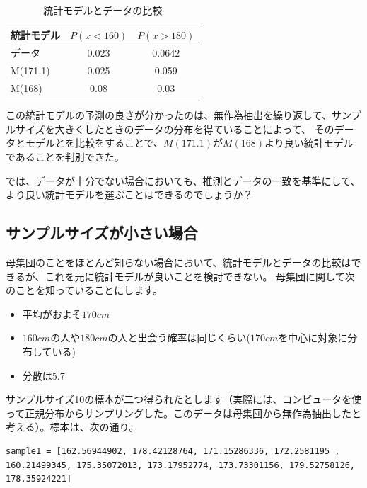 \begin{table}[hbtp]
    \caption{統計モデルとデータの比較}
    \label{table:data_type}
    \centering
    \begin{tabular}{lcc}
    統計モデル  & $P(x<160)$  & $P(x>180)$   \\
    \hline \hline
    データ &  0.023 &  0.0642\\
    M(171.1) & 0.025 & 0.059  \\
    M(168) &  0.08 & 0.03 \\
      \hline
    \end{tabular}
  \end{table}


この統計モデルの予測の良さが分かったのは、無作為抽出を繰り返して、サンプルサイズを大きくしたときのデータの分布を得ていることによって、
そのデータとモデルとを比較をすることで、$M(171.1)$が$M(168)$より良い統計モデルであることを判別できた。

では、データが十分でない場合においても、推測とデータの一致を基準にして、より良い統計モデルを選ぶことはできるのでしょうか？

\subsection{サンプルサイズが小さい場合}
母集団のことをほとんど知らない場合において、統計モデルとデータの比較はできるが、これを元に統計モデルが良いことを検討できない。
母集団に関して次のことを知っていることにします。
\begin{itemize}
    \item 平均がおよそ$170cm$
    \item $160cm$の人や$180cm$の人と出会う確率は同じくらい($170cm$を中心に対象に分布している)
    \item 分散は5.7
\end{itemize}
\fi
サンプルサイズ10の標本が二つ得られたとします（実際には、コンピュータを使って正規分布からサンプリングした。このデータは母集団から無作為抽出したと考える）。標本は、次の通り。

\begin{lstlisting}
sample1 = [162.56944902, 178.42128764, 171.15286336, 172.2581195 , 160.21499345, 175.35072013, 173.17952774, 173.73301156, 179.52758126, 178.35924221]
\end{lstlisting}

